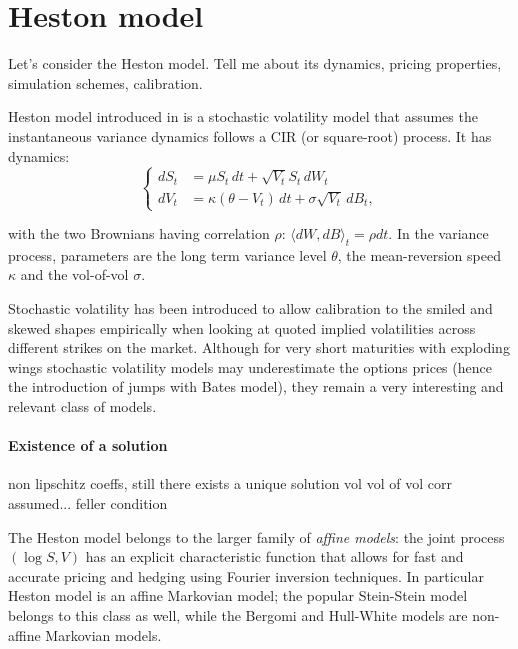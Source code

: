 \section{Heston model}

\begin{tcolorbox}[width=\linewidth, sharp corners=all, colback=white!95!black]
    Let's consider the Heston model. Tell me about its dynamics, pricing properties, simulation schemes, calibration.

\end{tcolorbox}

Heston model introduced in \cite{heston1993closed} is a stochastic volatility model that assumes the instantaneous variance dynamics follows a CIR (or square-root) process. It has dynamics:
\begin{equation*}
    \left\{
    \begin{aligned}
        dS_t &= \mu S_t \, dt + \sqrt{V_t}S_t \, dW_t \\
        dV_t &= \kappa (\theta - V_t) \, dt + \sigma \sqrt{V_t} \, dB_t,
    \end{aligned}
    \right.
\end{equation*}

with the two Brownians having correlation $\rho$: $\langle dW, dB \rangle_t = \rho dt.$ In the variance process, parameters are the long term variance level $\theta$, the mean-reversion speed $\kappa$  and the vol-of-vol $\sigma$.

Stochastic volatility has been introduced to allow calibration to the smiled and skewed shapes empirically when looking at quoted implied volatilities across different strikes on the market. Although for very short maturities with exploding wings stochastic volatility models may underestimate the options prices (hence the introduction of jumps with Bates model), they remain a very interesting and relevant class of models.

\paragraph*{Existence of a solution}
non lipschitz coeffs, still there exists a unique solution
vol vol of vol corr assumed... 
feller condition

The Heston model belongs to the larger family of \textit{affine models}: the joint process $(\log S, V)$ has an explicit characteristic function that allows for fast and accurate pricing and hedging using Fourier inversion techniques. In  particular Heston model is an affine Markovian model; the popular Stein-Stein model belongs to this class as well, while the Bergomi and Hull-White models are non-affine Markovian models. 




